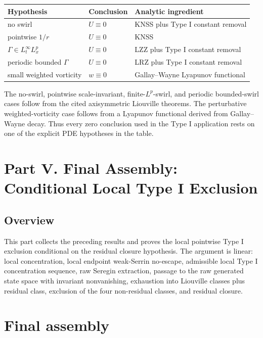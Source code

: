 \documentclass[11pt]{amsart}
\theoremstyle{plain}
\theoremstyle{definition}
\theoremstyle{remark}
\numberwithin{equation}{section}
\begin{document}
\begin{center}
\begin{tabular}{p{}p{}p{}}
\hline
Hypothesis & Conclusion & Analytic ingredient \\
\hline
no swirl & \(U\equiv0\) & KNSS plus Type I constant removal \\
pointwise \(1/r\) & \(U\equiv0\) & KNSS \\
\(\Gamma\in L_t^\infty L_x^p\) & \(U\equiv0\) & LZZ plus Type I constant removal \\
periodic bounded \(\Gamma\) & \(U\equiv0\) & LRZ plus Type I constant removal \\
small weighted vorticity & \(w\equiv0\) & Gallay--Wayne Lyapunov functional \\
\hline
\end{tabular}
\end{center}

The no-swirl, pointwise scale-invariant, finite-\(L^p\)-swirl, and periodic
bounded-swirl cases follow from the cited axisymmetric Liouville theorems.
The perturbative weighted-vorticity case follows from a Lyapunov functional
derived from Gallay--Wayne decay.
Thus every zero conclusion used in the Type I application rests on one of the
explicit PDE hypotheses in the table.

\clearpage
\section*{Part V. Final Assembly: Conditional Local Type I Exclusion}
\label{p1:sec:final-assembly}

\subsection*{Overview}

This part collects the preceding results and proves the local pointwise Type I
exclusion conditional on the residual closure hypothesis.  The argument is
linear: local concentration, local endpoint weak-Serrin no-escape, admissible
local Type I concentration sequence, raw Seregin extraction, passage to the
raw generated state space with invariant nonvanishing, exhaustion into
Liouville classes plus residual class, exclusion of the four non-residual
classes, and residual closure.

\section{Final assembly}
\end{document}

